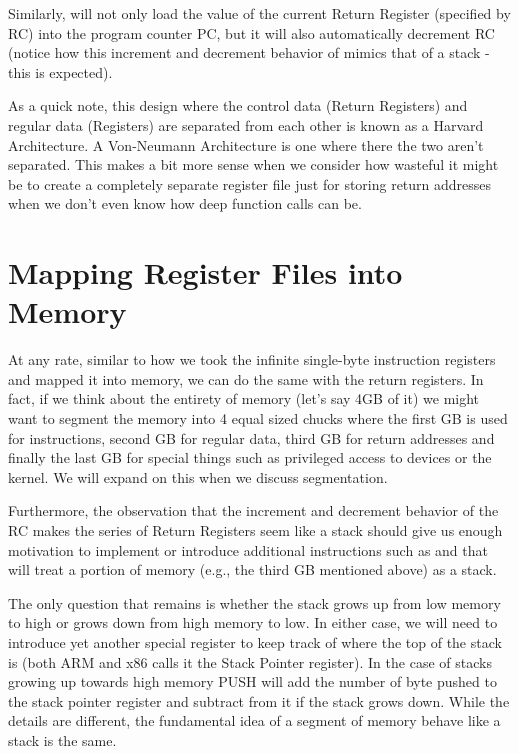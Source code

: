 Similarly,  will not only load the value of the current Return Register (specified by RC) into the program counter PC, but it will also automatically decrement RC (notice how this increment and decrement behavior of mimics that of a stack - this is expected).

As a quick note, this design where the control data (Return Registers) and regular data (Registers) are separated from each other is known as a Harvard Architecture. A Von-Neumann Architecture is one where there the two aren’t separated. This makes a bit more sense when we consider how wasteful it might be to create a completely separate register file just for storing return addresses when we don’t even know how deep function calls can be. 

\section{Mapping Register Files into Memory}

At any rate, similar to how we took the infinite single-byte instruction registers and mapped it into memory, we can do the same with the return registers. In fact, if we think about the entirety of memory (let’s say 4GB of it) we might want to segment the memory into 4 equal sized chucks where the first GB is used for instructions, second GB for regular data, third GB for return addresses and finally the last GB for special things such as privileged access to devices or the kernel. We will expand on this when we discuss segmentation.

Furthermore, the observation that the increment and decrement behavior of the RC makes the series of Return Registers seem like a stack should give us enough motivation to implement or introduce additional instructions such as  and  that will treat a portion of memory (e.g., the third GB mentioned above) as a stack. 

The only question that remains is whether the stack grows up from low memory to high or grows down from high memory to low. In either case, we will need to introduce yet another special register to keep track of where the top of the stack is (both ARM and x86 calls it the Stack Pointer register). In the case of stacks growing up towards high memory PUSH will add the number of byte pushed to the stack pointer register and subtract from it if the stack grows down. While the details are different, the fundamental idea of a segment of memory behave like a stack is the same. 

